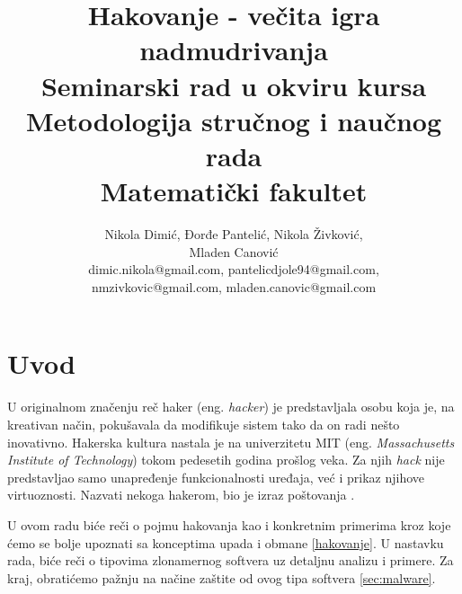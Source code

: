 \documentclass[a4paper]{article}
\begin{document}
\sloppy


\title{Hakovanje - večita igra nadmudrivanja\\ \small{Seminarski rad u okviru kursa\\Metodologija stručnog i naučnog rada\\ Matematički fakultet}}

\author{Nikola Dimić, Đorđe Pantelić, Nikola Živković,\\Mladen Canović\\ dimic.nikola@gmail.com, pantelicdjole94@gmail.com,\\nmzivkovic@gmail.com, mladen.canovic@gmail.com}


\maketitle


\setcounter{tocdepth}{2}
\tableofcontents

\newpage

\section{Uvod}
\label{sec:uvod}
U originalnom značenju reč haker (eng. \textit{hacker}) je predstavljala osobu koja je, na kreativan način, pokušavala da modifikuje sistem tako da on radi nešto inovativno. Hakerska kultura nastala je na univerzitetu MIT (eng. \textit{Massachusetts Institute of Technology}) tokom pedesetih godina prošlog veka. Za njih \textit{hack} nije predstavljao samo unapređenje funkcionalnosti uređaja, već i prikaz njihove virtuoznosti. Nazvati nekoga hakerom, bio je izraz poštovanja \cite{ethics}.

U ovom radu biće reči o pojmu hakovanja kao i konkretnim primerima kroz koje ćemo se bolje upoznati sa konceptima 
upada i obmane \ref{hakovanje}. U nastavku rada, biće reči o tipovima zlonamernog softvera uz detaljnu analizu i primere. Za kraj, obratićemo pažnju na načine zaštite od ovog tipa softvera \ref{sec:malware}.
\end{document}
